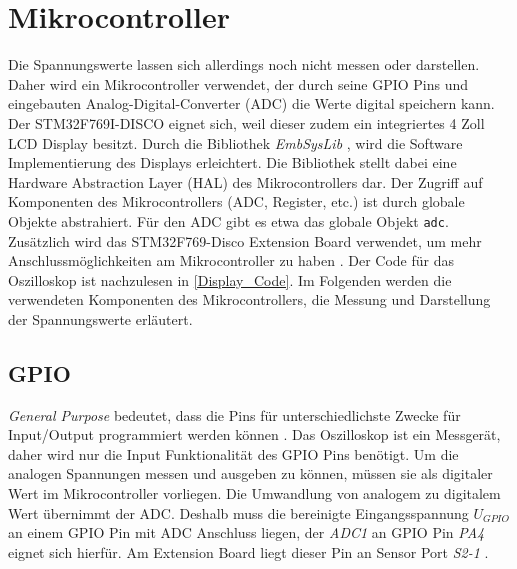 \section{Mikrocontroller}
\label{Mikrocontroller}

Die Spannungswerte lassen sich allerdings noch nicht messen oder darstellen.
Daher wird ein Mikrocontroller verwendet, der durch seine GPIO Pins und eingebauten
Analog-Digital-Converter (ADC) die Werte digital speichern kann.
Der STM32F769I-DISCO eignet sich, weil dieser zudem ein integriertes 4 Zoll LCD Display
besitzt\cite{MikroControllerDatasheet_1}.
Durch die Bibliothek \textit{EmbSysLib} \cite{EmbSysLib}, wird die Software Implementierung des
Displays erleichtert.
Die Bibliothek stellt dabei eine Hardware Abstraction Layer (HAL) des Mikrocontrollers dar.
Der Zugriff auf Komponenten des Mikrocontrollers (ADC, Register, etc.) ist durch globale Objekte
abstrahiert. Für den ADC gibt es etwa das globale Objekt \texttt{adc}.
Zusätzlich wird das STM32F769-Disco Extension Board verwendet, um mehr
Anschlussmöglichkeiten am Mikrocontroller zu haben \cite{MikrocontrollerExtension}.
Der Code für das Oszilloskop ist nachzulesen in \ref{Display_Code}.
Im Folgenden werden die verwendeten Komponenten des Mikrocontrollers, die Messung und
Darstellung der Spannungswerte erläutert.

\subsection{GPIO}
\textit{General Purpose} bedeutet, dass die Pins für unterschiedlichste Zwecke für
Input/Output programmiert werden können \cite{RPI-GPIO}. \newline
Das Oszilloskop ist ein Messgerät, daher wird nur die Input Funktionalität des GPIO Pins benötigt.
Um die analogen Spannungen messen und ausgeben zu können, müssen sie als digitaler Wert
im Mikrocontroller vorliegen. \newline
Die Umwandlung von analogem zu digitalem Wert übernimmt der ADC\cite{MikroControllerDatasheet_1}.
Deshalb muss die bereinigte Eingangsspannung $U_{GPIO}$ an einem GPIO Pin mit ADC Anschluss liegen,
der \textit{ADC1} an GPIO Pin \textit{PA4} eignet sich hierfür\cite{STM32F769_PinLayout, MikroControllerDatasheet_Pins}.
Am Extension Board liegt dieser Pin an Sensor Port \textit{S2-1} \cite{MikrocontrollerExtension}.


